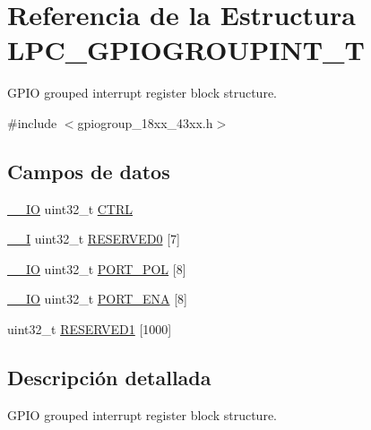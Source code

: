 \hypertarget{struct_l_p_c___g_p_i_o_g_r_o_u_p_i_n_t___t}{}\section{Referencia de la Estructura L\+P\+C\+\_\+\+G\+P\+I\+O\+G\+R\+O\+U\+P\+I\+N\+T\+\_\+T}
\label{struct_l_p_c___g_p_i_o_g_r_o_u_p_i_n_t___t}


G\+P\+IO grouped interrupt register block structure.  




{\ttfamily \#include $<$gpiogroup\+\_\+18xx\+\_\+43xx.\+h$>$}

\subsection*{Campos de datos}
\begin{DoxyCompactItemize}
\item 
\hyperlink{core__sc300_8h_aec43007d9998a0a0e01faede4133d6be}{\+\_\+\+\_\+\+IO} uint32\+\_\+t \hyperlink{struct_l_p_c___g_p_i_o_g_r_o_u_p_i_n_t___t_a15fc8d35f045f329b80c544bef35ff64}{C\+T\+RL}
\item 
\hyperlink{core__sc300_8h_af63697ed9952cc71e1225efe205f6cd3}{\+\_\+\+\_\+I} uint32\+\_\+t \hyperlink{struct_l_p_c___g_p_i_o_g_r_o_u_p_i_n_t___t_aed987d938203d539600a9b6c6f221ad4}{R\+E\+S\+E\+R\+V\+E\+D0} \mbox{[}7\mbox{]}
\item 
\hyperlink{core__sc300_8h_aec43007d9998a0a0e01faede4133d6be}{\+\_\+\+\_\+\+IO} uint32\+\_\+t \hyperlink{struct_l_p_c___g_p_i_o_g_r_o_u_p_i_n_t___t_a31a0cb631ddc723b8277b38f7c169cc9}{P\+O\+R\+T\+\_\+\+P\+OL} \mbox{[}8\mbox{]}
\item 
\hyperlink{core__sc300_8h_aec43007d9998a0a0e01faede4133d6be}{\+\_\+\+\_\+\+IO} uint32\+\_\+t \hyperlink{struct_l_p_c___g_p_i_o_g_r_o_u_p_i_n_t___t_a1adf1285b0f28fae9537b4cd71646145}{P\+O\+R\+T\+\_\+\+E\+NA} \mbox{[}8\mbox{]}
\item 
uint32\+\_\+t \hyperlink{struct_l_p_c___g_p_i_o_g_r_o_u_p_i_n_t___t_ad63c2ea328b20476d7137cab031e6e09}{R\+E\+S\+E\+R\+V\+E\+D1} \mbox{[}1000\mbox{]}
\end{DoxyCompactItemize}


\subsection{Descripción detallada}
G\+P\+IO grouped interrupt register block structure. 

